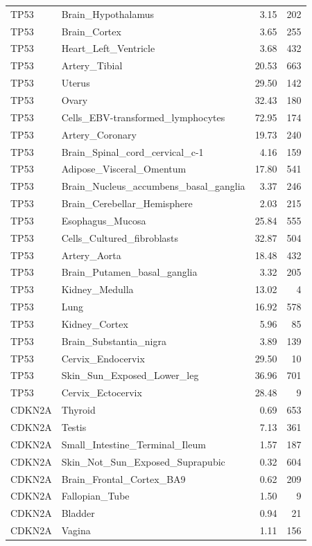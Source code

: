 \begin{footnotesize}
\begin{longtable}{llrr}
TP53 & Brain\_Hypothalamus & 3.15 & 202 \\
TP53 & Brain\_Cortex & 3.65 & 255 \\
TP53 & Heart\_Left\_Ventricle & 3.68 & 432 \\
TP53 & Artery\_Tibial & 20.53 & 663 \\
TP53 & Uterus & 29.50 & 142 \\
TP53 & Ovary & 32.43 & 180 \\
TP53 & Cells\_EBV-transformed\_lymphocytes & 72.95 & 174 \\
TP53 & Artery\_Coronary & 19.73 & 240 \\
TP53 & Brain\_Spinal\_cord\_cervical\_c-1 & 4.16 & 159 \\
TP53 & Adipose\_Visceral\_Omentum & 17.80 & 541 \\
TP53 & Brain\_Nucleus\_accumbens\_basal\_ganglia & 3.37 & 246 \\
TP53 & Brain\_Cerebellar\_Hemisphere & 2.03 & 215 \\
TP53 & Esophagus\_Mucosa & 25.84 & 555 \\
TP53 & Cells\_Cultured\_fibroblasts & 32.87 & 504 \\
TP53 & Artery\_Aorta & 18.48 & 432 \\
TP53 & Brain\_Putamen\_basal\_ganglia & 3.32 & 205 \\
TP53 & Kidney\_Medulla & 13.02 & 4 \\
TP53 & Lung & 16.92 & 578 \\
TP53 & Kidney\_Cortex & 5.96 & 85 \\
TP53 & Brain\_Substantia\_nigra & 3.89 & 139 \\
TP53 & Cervix\_Endocervix & 29.50 & 10 \\
TP53 & Skin\_Sun\_Exposed\_Lower\_leg & 36.96 & 701 \\
TP53 & Cervix\_Ectocervix & 28.48 & 9 \\
CDKN2A & Thyroid & 0.69 & 653 \\
CDKN2A & Testis & 7.13 & 361 \\
CDKN2A & Small\_Intestine\_Terminal\_Ileum & 1.57 & 187 \\
CDKN2A & Skin\_Not\_Sun\_Exposed\_Suprapubic & 0.32 & 604 \\
CDKN2A & Brain\_Frontal\_Cortex\_BA9 & 0.62 & 209 \\
CDKN2A & Fallopian\_Tube & 1.50 & 9 \\
CDKN2A & Bladder & 0.94 & 21 \\
CDKN2A & Vagina & 1.11 & 156 \\

\end{longtable}
\end{footnotesize}
